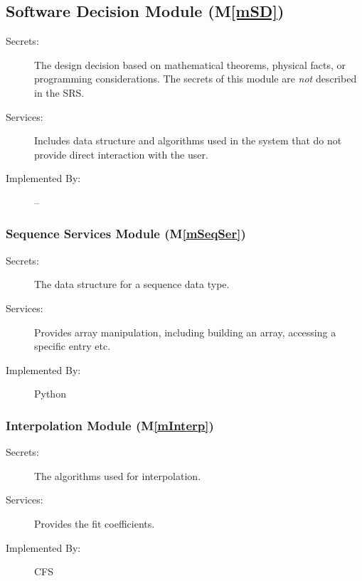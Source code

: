 \documentclass[12pt, titlepage]{article}
\newcommand{\mref}[1]{M\ref{#1}}
\newcommand{\famname}{CFS} %
\begin{document}


\subsection{Software Decision Module (\mref{mSD})}

\begin{description}
\item[Secrets:] The design decision based on mathematical theorems, physical
  facts, or programming considerations. The secrets of this module are
  \emph{not} described in the SRS.
\item[Services:] Includes data structure and algorithms used in the system that
  do not provide direct interaction with the user. 
\item[Implemented By:] --
\end{description}


\subsubsection{Sequence Services Module  (\mref{mSeqSer})}

\begin{description}
	\item[Secrets:] The data structure for a sequence data type.
	\item[Services:] Provides array manipulation, including building an array,
	accessing a specific entry etc.
	\item[Implemented By:] Python
\end{description} 

\subsubsection{Interpolation Module (\mref{mInterp})}

\begin{description}
	\item[Secrets:] The algorithms used for interpolation.
	\item[Services:] Provides the fit coefficients. 
	\item[Implemented By:] \famname{}
\end{description}
\end{document}
